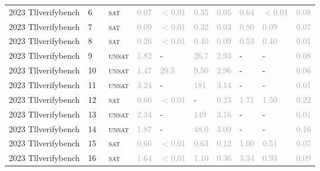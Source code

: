 \begin{center}
{\begin{longtable}{@{}llllllllll@{}}
2023 Tllverifybench & 6 & ~\textsc{sat} & \textcolor{darkgray}{0.07} & \textcolor{darkgray}{$<$0.01} & \textcolor{darkgray}{0.35} & \textcolor{darkgray}{0.05} & \textcolor{darkgray}{0.64} & \textcolor{darkgray}{$<$0.01} & \textcolor{darkgray}{0.08} \\
2023 Tllverifybench & 7 & ~\textsc{sat} & \textcolor{darkgray}{0.09} & \textcolor{darkgray}{$<$0.01} & \textcolor{darkgray}{0.32} & \textcolor{darkgray}{0.03} & \textcolor{darkgray}{0.80} & \textcolor{darkgray}{0.09} & \textcolor{darkgray}{0.07} \\
2023 Tllverifybench & 8 & ~\textsc{sat} & \textcolor{darkgray}{0.26} & \textcolor{darkgray}{$<$0.01} & \textcolor{darkgray}{0.40} & \textcolor{darkgray}{0.09} & \textcolor{darkgray}{0.53} & \textcolor{darkgray}{0.40} & \textcolor{darkgray}{0.01} \\
2023 Tllverifybench & 9 & ~\textsc{unsat} & \textcolor{darkgray}{1.82} & - & \textcolor{darkgray}{26.7} & \textcolor{darkgray}{2.93} & - & - & \textcolor{darkgray}{0.08} \\
2023 Tllverifybench & 10 & ~\textsc{unsat} & \textcolor{darkgray}{1.47} & \textcolor{darkgray}{29.3} & \textcolor{darkgray}{9.50} & \textcolor{darkgray}{2.96} & - & - & \textcolor{darkgray}{0.06} \\
2023 Tllverifybench & 11 & ~\textsc{unsat} & \textcolor{darkgray}{3.24} & - & \textcolor{darkgray}{181} & \textcolor{darkgray}{3.14} & - & - & \textcolor{darkgray}{0.01} \\
2023 Tllverifybench & 12 & ~\textsc{sat} & \textcolor{darkgray}{0.66} & \textcolor{darkgray}{$<$0.01} & - & \textcolor{darkgray}{0.23} & \textcolor{darkgray}{1.71} & \textcolor{darkgray}{1.50} & \textcolor{darkgray}{0.22} \\
2023 Tllverifybench & 13 & ~\textsc{unsat} & \textcolor{darkgray}{2.34} & - & \textcolor{darkgray}{149} & \textcolor{darkgray}{3.16} & - & - & \textcolor{darkgray}{0.01} \\
2023 Tllverifybench & 14 & ~\textsc{unsat} & \textcolor{darkgray}{1.87} & - & \textcolor{darkgray}{48.0} & \textcolor{darkgray}{3.09} & - & - & \textcolor{darkgray}{0.16} \\
2023 Tllverifybench & 15 & ~\textsc{sat} & \textcolor{darkgray}{0.66} & \textcolor{darkgray}{$<$0.01} & \textcolor{darkgray}{0.63} & \textcolor{darkgray}{0.12} & \textcolor{darkgray}{1.00} & \textcolor{darkgray}{0.51} & \textcolor{darkgray}{0.07} \\
2023 Tllverifybench & 16 & ~\textsc{sat} & \textcolor{darkgray}{1.64} & \textcolor{darkgray}{$<$0.01} & \textcolor{darkgray}{1.10} & \textcolor{darkgray}{0.36} & \textcolor{darkgray}{3.34} & \textcolor{darkgray}{0.93} & \textcolor{darkgray}{0.09} \\

\end{longtable}}
\end{center}
